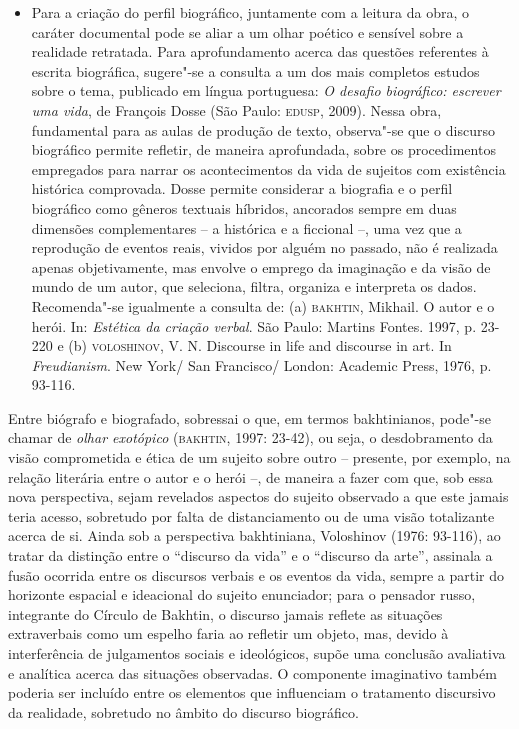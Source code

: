 \documentclass[12pt]{extarticle}
\begin{document}
\begin{itemize}
\item
  Para a criação do perfil biográfico, juntamente com a leitura da obra,
  o caráter documental pode se aliar a um olhar poético e sensível sobre
  a realidade retratada. Para aprofundamento acerca das questões
  referentes à escrita biográfica, sugere"-se a consulta a um dos mais
  completos estudos sobre o tema, publicado em língua portuguesa:
  \emph{O desafio biográfico: escrever uma vida}, de François Dosse (São
  Paulo: \textsc{edusp}, 2009). Nessa obra, fundamental para as aulas de produção
  de texto, observa"-se que o discurso biográfico permite refletir, de
  maneira aprofundada, sobre os procedimentos empregados para narrar os
  acontecimentos da vida de sujeitos com existência histórica
  comprovada. Dosse permite considerar a biografia e o perfil biográfico
  como gêneros textuais híbridos, ancorados sempre em duas dimensões
  complementares -- a histórica e a ficcional --, uma vez que a
  reprodução de eventos reais, vividos por alguém no passado, não é
  realizada apenas objetivamente, mas envolve o emprego da imaginação e
  da visão de mundo de um autor, que seleciona, filtra, organiza e
  interpreta os dados. Recomenda"-se igualmente a consulta de: (a)
  \textsc{bakhtin}, Mikhail. O autor e o herói. In: \emph{Estética da criação
  verbal}. São Paulo: Martins Fontes. 1997, p. 23-220 e (b) \textsc{voloshinov},
  V. N. Discourse in life and discourse in art. In \emph{Freudianism}.
  New York/ San Francisco/ London: Academic Press, 1976, p. 93-116.
\end{itemize}

Entre biógrafo e biografado, sobressai o que, em termos bakhtinianos,
pode"-se chamar de \emph{olhar exotópico} (\textsc{bakhtin}, 1997: 23-42), ou
seja, o desdobramento da visão comprometida e ética de um sujeito sobre
outro -- presente, por exemplo, na relação literária entre o autor e o
herói --, de maneira a fazer com que, sob essa nova perspectiva, sejam
revelados aspectos do sujeito observado a que este jamais teria acesso,
sobretudo por falta de distanciamento ou de uma visão totalizante acerca
de si. Ainda sob a perspectiva bakhtiniana, Voloshinov (1976: 93-116),
ao tratar da distinção entre o ``discurso da vida'' e o ``discurso da
arte'', assinala a fusão ocorrida entre os discursos verbais e os eventos
da vida, sempre a partir do horizonte espacial e ideacional do sujeito
enunciador; para o pensador russo, integrante do Círculo de Bakhtin, o
discurso jamais reflete as situações extraverbais como um espelho faria
ao refletir um objeto, mas, devido à interferência de julgamentos
sociais e ideológicos, supõe uma conclusão avaliativa e analítica acerca
das situações observadas. O componente imaginativo também poderia ser
incluído entre os elementos que influenciam o tratamento discursivo da
realidade, sobretudo no âmbito do discurso biográfico.
\end{document}

